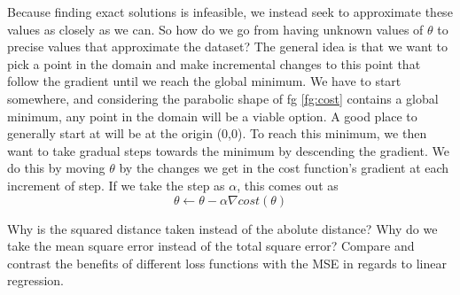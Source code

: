 Because finding exact solutions is infeasible, we instead seek to approximate
these values as closely as we can. So how do we go from having unknown values of
$\theta$ to precise values that approximate the dataset? The general idea is
that we want to pick a point in the domain and make incremental changes to this
point that follow the gradient until we reach the global minimum. We have to start
somewhere, and considering the parabolic shape of fg \ref{fg:cost} contains a
global minimum, any point in the domain will be a viable option. A good place to
generally start at will be at the origin (0,0). To reach this minimum, we then
want to take gradual steps towards the minimum by descending the gradient. We
do this by moving $\theta$ by the changes  we get in the cost
function's gradient at each increment of step. If we take the step as $\alpha$,
this comes out as
\begin{equation}
    \theta \leftarrow \theta - \alpha \nabla cost(\theta)
\end{equation}


\begin{exercise}
    \ex Why is the squared distance taken instead of the abolute distance?
    \ex Why do we take the mean square error instead of the total square error?
    \ex Compare and contrast the benefits of different loss functions with the
    MSE in regards to linear regression.
\end{exercise}

